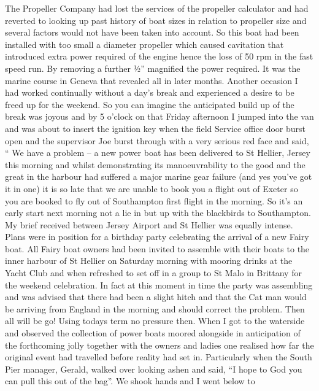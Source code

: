 
The Propeller Company had lost the services of the propeller calculator and had
reverted to looking up past history of boat sizes in relation to propeller size
and several factors would not have been taken into account.  So this boat had
been installed with too small a diameter propeller which caused cavitation that
introduced extra power required of the engine hence the loss of 50 rpm in the
fast speed run.  By removing a further ½'' magnified the power required.  It
was the marine course in Geneva that revealed all in later months. Another
occasion I had worked continually without a day's break and experienced a
desire to be freed up for the weekend.  So you can imagine the anticipated
build up of the break was joyous  and by 5 o'clock on that Friday afternoon I
jumped into the van and was about to insert the ignition key when the field
Service office door burst open and the supervisor Joe burst through with a very
serious red face and said, `` We have a problem – a new power boat has been
delivered to St Hellier, Jersey this morning and whilst demonstrating its
manoeuvrability to the good and the great in the harbour had suffered a major
marine gear failure  (and yes you've got it in one) it is so late that we are
unable to book you a flight out of Exeter so you are booked to fly out of
Southampton first flight in the morning.  So it's an early start next morning
not a lie in but up with the blackbirds to Southampton.  My brief received
between Jersey Airport and St Hellier was equally intense. Plans were in
position for a birthday party celebrating the arrival of a new Fairy boat.  All
Fairy boat owners had been invited to assemble with their boats to the inner
harbour of St Hellier on Saturday morning with mooring drinks at the Yacht Club
and when refreshed to set off in a group to St Malo in Brittany for the weekend
celebration.  In fact at this moment in time the party was assembling and was
advised that there had been a slight hitch and that the Cat man would be
arriving from England in the morning and should correct the problem.  Then all
will be go!  Using todays term no pressure then.  When I got to the waterside
and observed the collection of power boats moored alongside in anticipation of
the forthcoming jolly together with the owners and ladies one realised how far
the original event had travelled before reality had set in.  Particularly when
the South Pier manager, Gerald, walked over looking ashen and said, ``I hope to
God you can pull this out of the bag''.  We shook hands and I went below to
